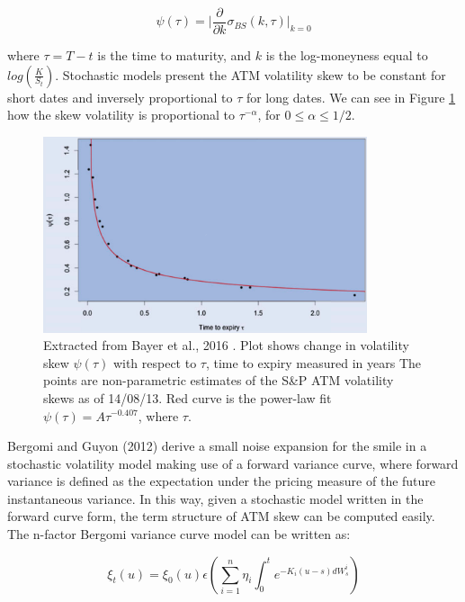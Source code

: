 \documentclass[12pt,oneside]{article}
\begin{document}
\begin{equation}
    \psi(\tau) = \lvert \frac{\partial}{\partial k} \sigma_{BS}(k,\tau) \rvert_{k = 0}
\end{equation}

where $\tau = T - t$ is the time to maturity, and $k$ is the log-moneyness equal to $log(\frac{K}{S_{t}})$. Stochastic models present the ATM volatility skew to be constant for short dates and inversely proportional to $\tau$ for long dates. We can see in Figure \ref{fig:Bayer2016_vol_skew} how the skew volatility is proportional to $\tau^{-\alpha}$, for $0\leq \alpha \leq 1/2$. 
\\

\begin{figure}[htpb]
    \centering
    \includegraphics[width=0.85\textwidth ]{figs/Bayer2016_fig2.png}
    \caption{Extracted from Bayer et al., 2016  \cite[Figure~2]{Bayer2016}. Plot shows change in volatility skew $\psi(\tau)$ with respect to $\tau$, time to expiry measured in years The points are non-parametric estimates of the S\&P ATM volatility skews as of 14/08/13. Red curve is the power-law fit $\psi(\tau) = A\tau^{−0.407}$, where $\tau$.}
    \label{fig:Bayer2016_vol_skew}
\end{figure}

Bergomi and Guyon (2012) derive a small noise expansion for the smile in a stochastic volatility model making use of a forward variance curve, where forward variance is defined as the expectation under the pricing measure of the future instantaneous variance. In this way, given a stochastic model written in the forward curve form, the term structure of ATM skew can be computed easily. The n-factor Bergomi variance curve model can be written as:

\begin{equation}
\label{eq:Bergomimodel}
    \xi_{t}(u) = \xi_{0}(u) \epsilon(\sum_{i=1}^{n} \eta_{i} \int_{0}^{t} e^{-K_{i}(u-s) dW_{s}^{i}})
\end{equation}
\end{document}
